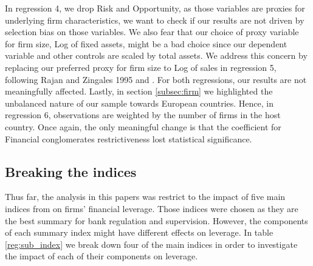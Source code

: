 \documentclass[12pt]{article}
\begin{document}
	In regression 4, we drop Risk and Opportunity, as those variables are proxies for underlying firm characteristics, we want to check if our results are not driven by selection bias on those variables. We also fear that our choice of proxy variable for firm size, Log of fixed assets, might be a bad choice since our dependent variable and other controls are scaled by total assets. We address this concern by replacing our preferred proxy for firm size to Log of sales in regression 5, following  Rajan and Zingales 1995 and \cite{huizinga2008capital}. For both regressions, our results are not meaningfully affected. Lastly, in section \ref{subsec:firm} we highlighted the unbalanced nature of our sample towards European countries. Hence, in regression 6, observations are weighted by the number of firms in the host country. Once again, the only meaningful change is that the coefficient for Financial conglomerates restrictiveness lost statistical significance. 		

\subsection{Breaking the indices} \label{sec:sub_index}

Thus far, the analysis in this papers was restrict to the impact of five main indices from \cite{barth2013bank} on firms' financial leverage. Those indices were chosen as they are the best summary for bank regulation and supervision. However, the components of each summary index might have different effects on leverage. In table \ref{reg:sub_index} we break down four of the main indices in order to investigate the impact of each of their components on leverage. 
\end{document}
